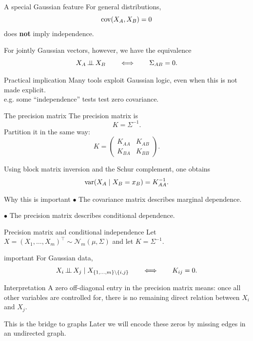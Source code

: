 \documentclass[dvipsnames,aspectratio=169,handout]{beamer}
\begin{document}
\begin{frame}{A special Gaussian feature}
For general distributions,
\[
\operatorname{cov}(X_A,X_B)=0
\]
does \textbf{not} imply independence.

\medskip

For jointly Gaussian vectors, however, we have the equivalence
\[
X_A\mbox{\,$\perp\!\!\!\perp$\,} X_B
\qquad\Longleftrightarrow\qquad
\Sigma_{AB}=0.
\]

\begin{block}{Practical implication}
Many tools exploit Gaussian logic,
even when this is not made explicit.\\
\qquad e.g. some ``independence'' tests test zero covariance.
\end{block}
\end{frame}

\begin{frame}{The precision matrix}
The \alert{precision matrix} is
\[
K=\Sigma^{-1}.
\]
Partition it in the same way:
\[
K=
\begin{pmatrix}
K_{AA} & K_{AB}\\
K_{BA} & K_{BB}
\end{pmatrix}.
\]

Using block matrix inversion and the Schur complement, one obtains
\[
\operatorname{var}(X_A\mid X_B=x_B)=K_{AA}^{-1}.
\]

\begin{alertblock}{Why this is important}
\quad $\bullet$ The covariance matrix describes marginal dependence.

\quad $\bullet$ The precision matrix describes conditional dependence.
\end{alertblock}
\end{frame}

\begin{frame}{Precision matrix and conditional independence}
Let $X=(X_1,\ldots,X_m)^\top\sim\mathcal N_m(\mu,\Sigma)$ and let $K=\Sigma^{-1}$.

\begin{beamercolorbox}[wd=\textwidth,sep=8pt,center,rounded=true,shadow=true]{important}
For Gaussian data,
\[
X_i\mbox{\,$\perp\!\!\!\perp$\,} X_j\mid X_{\{1,\ldots,m\}\setminus\{i,j\}}
\qquad\Longleftrightarrow\qquad
K_{ij}=0.
\]
\end{beamercolorbox}

\begin{block}{Interpretation}
A zero off-diagonal entry in the precision matrix means:
once all other variables are controlled for,
there is no remaining direct relation between $X_i$ and $X_j$.
\end{block}

\begin{alertblock}{This is the bridge to graphs}
Later we will encode these zeros by missing edges in an undirected graph.
\end{alertblock}
\end{frame}
\end{document}
